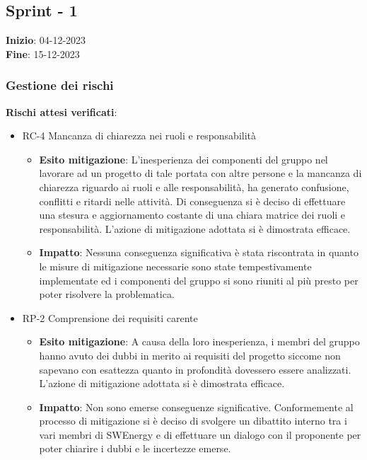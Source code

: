 \subsection{Sprint - 1}
\textbf{Inizio}: 04-12-2023 \\
\textbf{Fine}: 15-12-2023

\subsubsection{Gestione dei rischi}
\textbf{Rischi attesi verificati}:

\begin{itemize}
	\item RC-4 Mancanza di chiarezza nei ruoli e responsabilità
	\begin{itemize}
		\item \textbf{Esito mitigazione}: L'inesperienza dei componenti del gruppo nel lavorare ad un progetto di tale portata con altre persone 
		e la mancanza di chiarezza riguardo ai ruoli e alle responsabilità, ha generato confusione, conflitti e ritardi nelle attività. Di conseguenza 
		si è deciso di effettuare una stesura e aggiornamento costante di una chiara matrice dei ruoli e responsabilità. L'azione di mitigazione adottata si è dimostrata efficace.

		\item \textbf{Impatto}: Nessuna conseguenza significativa è stata riscontrata in quanto le misure di mitigazione necessarie sono state tempestivamente implementate
		ed i componenti del gruppo si sono riuniti al più presto per poter risolvere la problematica.

	\end{itemize}
	\item RP-2 Comprensione dei requisiti carente
	\begin{itemize}
		\item \textbf{Esito mitigazione}: A causa della loro inesperienza, i membri del gruppo hanno avuto dei dubbi in merito ai requisiti del progetto siccome 
	 	non sapevano con esattezza quanto in profondità dovessero essere analizzati. L'azione di mitigazione adottata si è dimostrata efficace.
		\item \textbf{Impatto}: Non sono emerse conseguenze significative. Conformemente al processo di mitigazione si è deciso di svolgere un dibattito interno tra i vari membri di SWEnergy
		e di effettuare un dialogo con il proponente per poter chiarire i dubbi e le incertezze emerse.
	\end{itemize}		
\end{itemize}  

